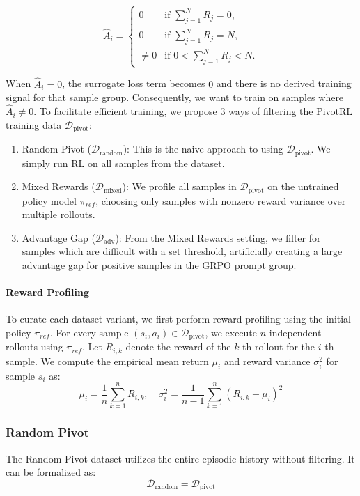 \begin{equation}
    \hat{A}_i = 
    \begin{cases} 
      0 & \text{if } \sum_{j=1}^{N} R_j = 0, \\
      0 & \text{if } \sum_{j=1}^{N} R_j = N, \\
      \neq 0 & \text{if } 0 < \sum_{j=1}^{N} R_j < N.
    \end{cases}
\end{equation}

When $\hat{A}_i = 0$, the surrogate loss term becomes $0$ and there is no derived training signal for that sample group. Consequently, we want to train on samples where $\hat{A}_i \not = 0$. To facilitate efficient training, we propose $3$ ways of filtering the PivotRL training data $\mathcal{D}_{\text{pivot}}$:
\begin{enumerate}
    \item Random Pivot ($\mathcal{D}_{\text{random}}$): This is the naive approach to using $\mathcal{D}_{\text{pivot}}$. We simply run RL on all samples from the dataset.
    \item Mixed Rewards ($\mathcal{D}_{\text{mixed}}$): We profile all samples in $\mathcal{D}_{\text{pivot}}$ on the untrained policy model $\pi_{ref}$, choosing only samples with nonzero reward variance over multiple rollouts.
    \item Advantage Gap ($\mathcal{D}_{\text{adv}}$): From the Mixed Rewards setting, we filter for samples which are difficult with a set threshold, artificially creating a large advantage gap for positive samples in the GRPO prompt group.
\end{enumerate}

\paragraph{Reward Profiling}
To curate each dataset variant, we first perform reward profiling using the initial policy $\pi_{ref}$. For every sample $(s_i, a_i) \in \mathcal{D}_{\text{pivot}}$, we execute $n$ independent rollouts using $\pi_{ref}$. Let $R_{i,k}$ denote the reward of the $k$-th rollout for the $i$-th sample. We compute the empirical mean return $\mu_i$ and reward variance $\sigma^2_i$ for sample $s_i$ as:
\begin{equation}
    \mu_i = \frac{1}{n} \sum_{k=1}^n R_{i,k}, \quad \sigma^2_i = \frac{1}{n-1} \sum_{k=1}^n (R_{i,k} - \mu_i)^2
\end{equation}

\subsubsection{Random Pivot}
The Random Pivot dataset utilizes the entire episodic history without filtering. It can be formalized as:
\begin{equation}
    \mathcal{D}_{\text{random}} = \mathcal{D}_{\text{pivot}}
\end{equation}

